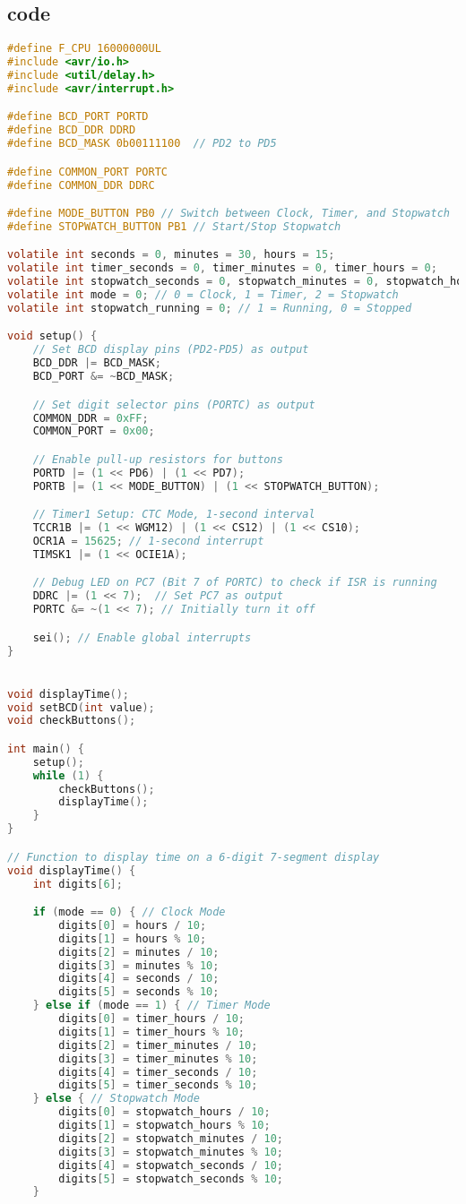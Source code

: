 \documentclass[journal]{IEEEtran}
\begin{document}
\subsection{code}
\begin{lstlisting}[language = C]
#define F_CPU 16000000UL
#include <avr/io.h>
#include <util/delay.h>
#include <avr/interrupt.h>

#define BCD_PORT PORTD
#define BCD_DDR DDRD
#define BCD_MASK 0b00111100  // PD2 to PD5

#define COMMON_PORT PORTC
#define COMMON_DDR DDRC

#define MODE_BUTTON PB0 // Switch between Clock, Timer, and Stopwatch
#define STOPWATCH_BUTTON PB1 // Start/Stop Stopwatch

volatile int seconds = 0, minutes = 30, hours = 15;
volatile int timer_seconds = 0, timer_minutes = 0, timer_hours = 0;
volatile int stopwatch_seconds = 0, stopwatch_minutes = 0, stopwatch_hours = 0;
volatile int mode = 0; // 0 = Clock, 1 = Timer, 2 = Stopwatch
volatile int stopwatch_running = 0; // 1 = Running, 0 = Stopped

void setup() {
    // Set BCD display pins (PD2-PD5) as output
    BCD_DDR |= BCD_MASK;
    BCD_PORT &= ~BCD_MASK;

    // Set digit selector pins (PORTC) as output
    COMMON_DDR = 0xFF;
    COMMON_PORT = 0x00;

    // Enable pull-up resistors for buttons
    PORTD |= (1 << PD6) | (1 << PD7);
    PORTB |= (1 << MODE_BUTTON) | (1 << STOPWATCH_BUTTON);

    // Timer1 Setup: CTC Mode, 1-second interval
    TCCR1B |= (1 << WGM12) | (1 << CS12) | (1 << CS10);
    OCR1A = 15625; // 1-second interrupt
    TIMSK1 |= (1 << OCIE1A);

    // Debug LED on PC7 (Bit 7 of PORTC) to check if ISR is running
    DDRC |= (1 << 7);  // Set PC7 as output
    PORTC &= ~(1 << 7); // Initially turn it off

    sei(); // Enable global interrupts
}


void displayTime();
void setBCD(int value);
void checkButtons();

int main() {
    setup();
    while (1) {
        checkButtons();
        displayTime();
    }
}

// Function to display time on a 6-digit 7-segment display
void displayTime() {
    int digits[6];

    if (mode == 0) { // Clock Mode
        digits[0] = hours / 10;
        digits[1] = hours % 10;
        digits[2] = minutes / 10;
        digits[3] = minutes % 10;
        digits[4] = seconds / 10;
        digits[5] = seconds % 10;
    } else if (mode == 1) { // Timer Mode
        digits[0] = timer_hours / 10;
        digits[1] = timer_hours % 10;
        digits[2] = timer_minutes / 10;
        digits[3] = timer_minutes % 10;
        digits[4] = timer_seconds / 10;
        digits[5] = timer_seconds % 10;
    } else { // Stopwatch Mode
        digits[0] = stopwatch_hours / 10;
        digits[1] = stopwatch_hours % 10;
        digits[2] = stopwatch_minutes / 10;
        digits[3] = stopwatch_minutes % 10;
        digits[4] = stopwatch_seconds / 10;
        digits[5] = stopwatch_seconds % 10;
    }


\end{lstlisting}
\end{document}
